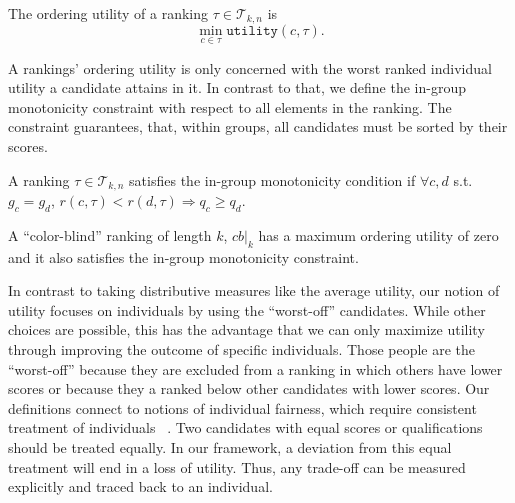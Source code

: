 \begin{definition}
	\label{def:orderingFairness}
	The ordering utility of a ranking $\tau \in {\mathcal T}_{k,n}$ is \[\min_{c \in \tau} \texttt{utility}(c,\tau).\]
\end{definition}

\noindent A rankings' ordering utility is only concerned with the worst ranked individual utility a candidate attains in it. In contrast to that, we define the in-group monotonicity constraint with respect to all elements in the ranking. The constraint guarantees, that, within groups, all candidates must be sorted by their scores.

\begin{definition}
	\label{def:inGroupMonotonicity}
	A ranking $\tau \in {\mathcal T}_{k,n}$ satisfies the in-group monotonicity condition if $\forall c,d$ s.t. $g_c = g_d$, $r(c,\tau) < r(d,\tau) \Rightarrow q_c \ge q_d$.
\end{definition}

\noindent  A ``color-blind'' ranking of length $k$, $\textit{cb}|_k$ has a maximum ordering utility of zero and it also satisfies the in-group monotonicity constraint.

\label{concept:our-utility-individual-fairness}
%
In contrast to taking distributive measures like the average utility, our notion of utility focuses on individuals by using the ``worst-off'' candidates.
%
While other choices are possible, this has the advantage that we can only maximize utility through improving the outcome of specific individuals. Those people are the ``worst-off'' because they are excluded from a ranking in which others have lower scores or because they a ranked below other candidates with lower scores.
%
Our definitions connect to notions of individual fairness, which require consistent treatment of individuals ~\cite{Dwork2012}. Two candidates with equal scores or qualifications should be treated equally. In our framework, a deviation from this equal treatment will end in a loss of utility. Thus, any trade-off can be measured explicitly and traced back to an individual.

